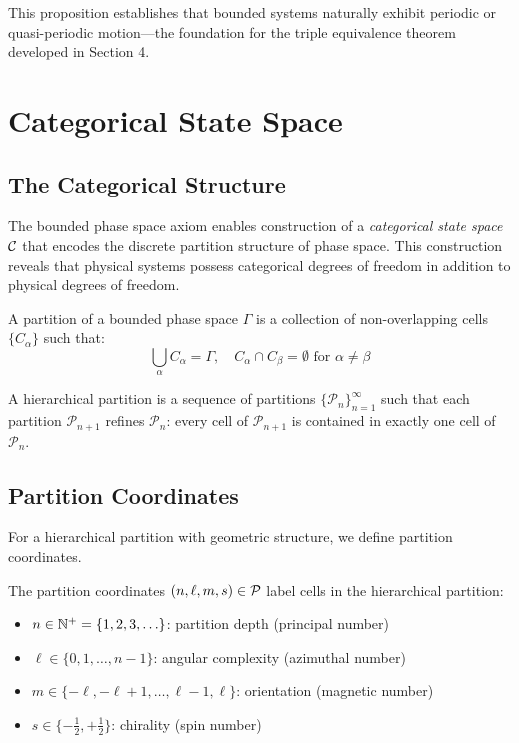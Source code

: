 This proposition establishes that bounded systems naturally exhibit periodic or quasi-periodic motion---the foundation for the triple equivalence theorem developed in Section 4.

\section{Categorical State Space}

\subsection{The Categorical Structure}

The bounded phase space axiom enables construction of a \textit{categorical state space} $\mathcal{C}$ that encodes the discrete partition structure of phase space. This construction reveals that physical systems possess categorical degrees of freedom in addition to physical degrees of freedom.

\begin{definition}
A partition of a bounded phase space $\Gamma$ is a collection of non-overlapping cells $\{C_\alpha\}$ such that:
\begin{equation}
\bigcup_\alpha C_\alpha = \Gamma, \quad C_\alpha \cap C_\beta = \emptyset \text{ for } \alpha \neq \beta
\end{equation}
\end{definition}

\begin{definition}
A hierarchical partition is a sequence of partitions $\{\mathcal{P}_n\}_{n=1}^{\infty}$ such that each partition $\mathcal{P}_{n+1}$ refines $\mathcal{P}_n$: every cell of $\mathcal{P}_{n+1}$ is contained in exactly one cell of $\mathcal{P}_n$.
\end{definition}

\subsection{Partition Coordinates}

For a hierarchical partition with geometric structure, we define partition coordinates.

\begin{definition}
\label{def:partition_coords}
The partition coordinates $(n,\ell,m,s) \in \mathcal{P}$ label cells in the hierarchical partition:
\begin{itemize}
    \item $n \in \mathbb{N}^+ = \{1, 2, 3, \ldots\}$: partition depth (principal number)
    \item $\ell \in \{0, 1, \ldots, n-1\}$: angular complexity (azimuthal number)
    \item $m \in \{-\ell, -\ell+1, \ldots, \ell-1, \ell\}$: orientation (magnetic number)
    \item $s \in \{-\frac{1}{2}, +\frac{1}{2}\}$: chirality (spin number)
\end{itemize}
\end{definition}

